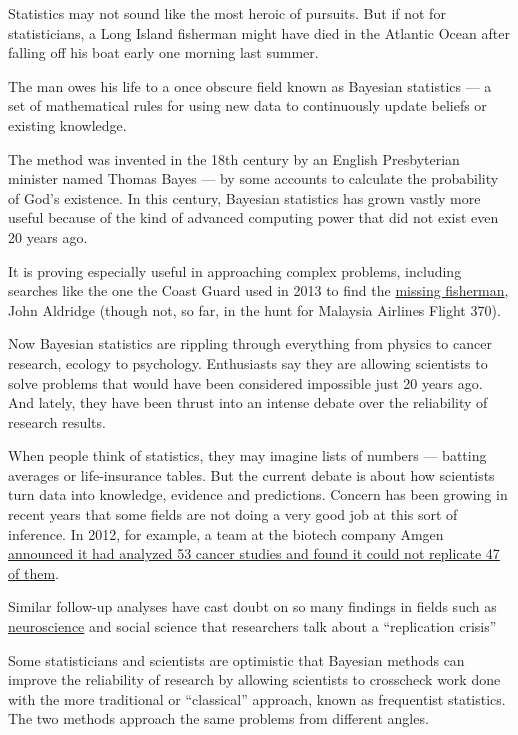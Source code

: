 Statistics may not sound like the most heroic of pursuits. But if not
for statisticians, a Long Island fisherman might have died in the
Atlantic Ocean after falling off his boat early one morning last summer.

The man owes his life to a once obscure field known as Bayesian
statistics --- a set of mathematical rules for using new data to
continuously update beliefs or existing knowledge.

The method was invented in the 18th century by an English Presbyterian
minister named Thomas Bayes --- by some accounts to calculate the
probability of God's existence. In this century, Bayesian statistics has
grown vastly more useful because of the kind of advanced computing power
that did not exist even 20 years ago.

It is proving especially useful in approaching complex problems,
including searches like the one the Coast Guard used in 2013 to find the
\href{http://www.nytimes3xbfgragh.onion/2014/01/05/magazine/a-speck-in-the-sea.html?_r=0}{missing
fisherman}, John Aldridge (though not, so far, in the hunt for Malaysia
Airlines Flight 370).

Now Bayesian statistics are rippling through everything from physics to
cancer research, ecology to psychology. Enthusiasts say they are
allowing scientists to solve problems that would have been considered
impossible just 20 years ago. And lately, they have been thrust into an
intense debate over the reliability of research results.

When people think of statistics, they may imagine lists of numbers ---
batting averages or life-insurance tables. But the current debate is
about how scientists turn data into knowledge, evidence and predictions.
Concern has been growing in recent years that some fields are not doing
a very good job at this sort of inference. In 2012, for example, a team
at the biotech company Amgen
\href{http://www.nature.com/nature/journal/v483/n7391/full/483531a.html}{announced
it had analyzed 53 cancer studies and found it could not replicate 47 of
them}.

Similar follow-up analyses have cast doubt on so many findings in fields
such as
\href{http://www.nature.com/nrn/journal/v14/n5/abs/nrn3475.html}{neuroscience}
and social science that researchers talk about a ``replication crisis''

Some statisticians and scientists are optimistic that Bayesian methods
can improve the reliability of research by allowing scientists to
crosscheck work done with the more traditional or ``classical''
approach, known as frequentist statistics. The two methods approach the
same problems from different angles.

